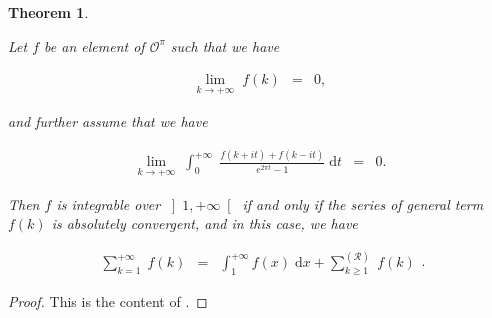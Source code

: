 \documentclass{jams-l}
\newtheorem{theorem}{Theorem}[section]
\theoremstyle{definition}
\theoremstyle{remark}
\numberwithin{equation}{section}
\begin{document}
        \begin{theorem}
        \label{ThmRamanujanSum}
        
            Let $f$ be an element of $\mathcal{O}^{\pi}$ such that we have
            
            \[ \begin{array}{lll}
                    \lim\limits_{k \rightarrow + \infty} \; f \left( k \right) & = & 0,
                \end{array} \]
            
            \noindent and further assume that we have
            
            \[ \begin{array}{lll}
                    \lim\limits_{k \rightarrow + \infty} \; \int_0^{+ \infty} \; \frac{f \left( k + it \right) + f \left( k - it \right)}{e^{2 \pi t} - 1} \; \mathrm{d}t & = & 0.
                \end{array} \]
            
            \noindent Then $f$ is integrable over $\left] 1, + \infty \right[$ if and only if the series of general term $f \left( k \right)$ is absolutely convergent, and in this case, we have
            
            \[ \begin{array}{lll}
                    \sum\limits_{k=1}^{+ \infty} \; f \left( k \right) & = & \int_1^{+\infty} f \left( x \right) \; \mathrm{d}x + \sum\limits_{k \geqslant 1}^{\left( \mathcal{R} \right)} \; f \left( k \right)
                \end{array} . \]
        
        \end{theorem}
        
        \begin{proof}
        
            This is the content of \cite[Sec. 1.4.3]{MR3677185}.
        
        \end{proof}
        
\end{document}
